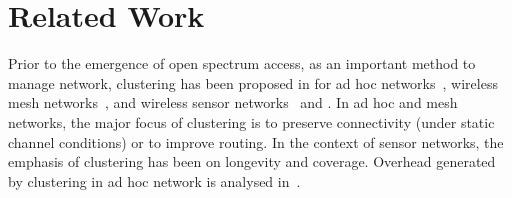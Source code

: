 \documentclass[journal,comsoc]{IEEEtran}
\theoremstyle{mytheoremstyle}
\theoremstyle{mytheoremstyle}
\theoremstyle{mytheoremstyle}
\begin{document}
\section{Related Work}
\label{related_work}

Prior to the emergence of open spectrum access, as an important method to manage network, clustering has been proposed in for ad hoc networks~\cite{Kawadia03,Lin97adaptiveclustering,Basagni99}, wireless mesh networks~\cite{Abbasi_survey_07}, and wireless sensor networks~\cite{Abbasi_survey_07} and . 
In ad hoc and mesh networks, the major focus of clustering is to preserve connectivity (under static channel conditions) or to improve routing.
In the context of sensor networks, the emphasis of clustering has been on longevity and coverage.
Overhead generated by clustering in ad hoc network is analysed in~\cite{clusterRoutingOverhead02infocom, clusterRoutingOverhead_wcnc04}.
\end{document}
